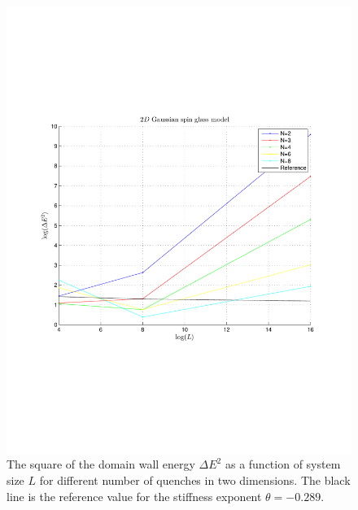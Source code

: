 \documentclass[paper=a4, fontsize=11pt]{scrartcl} %
\numberwithin{equation}{section} %
\numberwithin{figure}{section} %
\numberwithin{table}{section} %
\begin{document}
\begin{figure}
\centering
\includegraphics[width=\textwidth]{images/spinglass2D_small.pdf}
\caption{The square of the domain wall energy $\Delta E ^ 2$ as a function of system size $L$ for different number of quenches in two dimensions. The black line is the reference value for the stiffness exponent $\theta=-0.289$.}
\label{fig:E_2D_small}
\end{figure}
\end{document}
